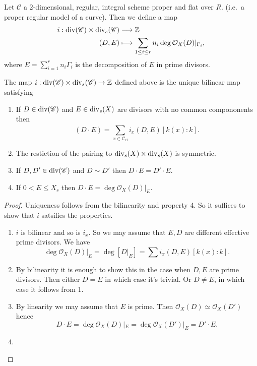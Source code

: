 \begin{definition}
	Let $\mathscr C$ a $2$-dimensional, regular, integral scheme proper and flat over $R$.  (i.e.\ a proper regular model of a curve). 
	Then we define a map
	\begin{align*}
		i: \operatorname{div}(\mathscr C) \times \operatorname{div}_s(\mathscr C) &\longrightarrow \mathbb{Z} \\
		(D, E) &\longmapsto \sum_{1 \le i \le r} n_i \deg \mathcal O_X(D)|_{\Gamma_i}
	,\end{align*}
	where $E = \sum_{i = 1}^{r} n_i \Gamma_i$ is the decomposition of $E$ in prime divisors. 
\end{definition}
	

\begin{theorem}\label{thm:defining_properties_intersection_pairing}
	The map $i: \operatorname{div}(\mathscr C) \times \operatorname{div}_s(\mathscr C) \rightarrow \mathbb{Z} $ defined above is the unique bilinear map satisfying
	\begin{enumerate}
		\item If $D \in \operatorname{div}(\mathscr{C} )$ and $E \in \operatorname{div}_s(X)$ are divisors with no common compononents then  \[
				(D\cdot E) = \sum_{x \in \mathscr{C}_\text{cl} }^{} i_x(D, E)[k(x):k]
			.\] 
		\item The restiction of the pairing to $\operatorname{div} _s (X) \times  \operatorname{div}_s(X)$ is symmetric.
		\item If $D, D' \in \operatorname{div} (\mathscr C)$ and $D \sim D'$ then $D\cdot E = D' \cdot E$. 
		\item If $0 < E \le X_s$ then $D \cdot E = \deg \mathcal{O}_X(D) |_E$. 
	\end{enumerate}
\end{theorem}
\begin{proof}
	Uniqueness follows from the bilinearity and property 4.
	So it suffices to show that $i$ satsifies the properties. 
	\begin{enumerate}
		\item $i$ is bilinear and so is $i_x$. 
			So we may assume that $E, D$ are different effective prime divisors.
			We have \[
				\deg \mathcal{O}_X(D)|_E = \deg [D|_E] = \sum i_x (D, E) [k(x):k]
			.\] 
		\item By bilinearity it is enough to show this in the case when $D, E$ are prime divisors. 
			Then either $D = E$ in which case it's trivial. 
			Or $D \ne E$, in which case it follows from 1.
		\item By linearity we may assume that $E$ is prime. 
			Then $\mathcal{O}_X(D) \simeq \mathcal{O}_X(D')$ hence
			\[
				D \cdot E = \deg \mathcal{O}_X(D)|_E = \deg \mathcal{O}_X(D') |_E = D' \cdot E
			.\] 
		\item {}
	\end{enumerate}
\end{proof}

